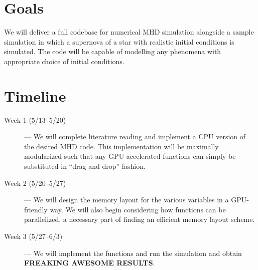 \documentclass[10pt]{article}
\begin{document}
\section{Goals}

We will deliver a full codebase for numerical MHD simulation alongside a sample simulation in which a supernova of a star with realistic initial conditions is simulated. The code will be capable of modelling any phenomena with appropriate choice of initial conditions.

\section{Timeline}

\begin{description}
    \item[Week 1 (5/13--5/20)] --- We will complete literature reading and implement a CPU version of the desired MHD code. This implementation will be maximally modularized such that any GPU-accelerated functions can simply be substituted in ``drag and drop'' fashion.

    \item[Week 2 (5/20--5/27)] --- We will design the memory layout for the various variables in a GPU-friendly way. We will also begin considering how functions can be parallelized, a necessary part of finding an efficient memory layout scheme.
        
    \item[Week 3 (5/27--6/3)] --- We will implement the functions and run the simulation and obtain \textbf{FREAKING AWESOME RESULTS}.
\end{description}
\end{document}
